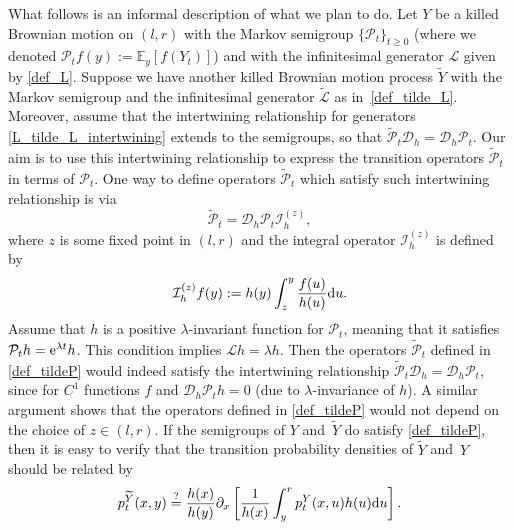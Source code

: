 \documentclass[pdftex]{sigma}
\numberwithin{equation}{section}
\theoremstyle{definition}
\def\L{{\mathcal L}}
\def\P{{\mathcal P}}
\def\D{{\mathcal D}}
\def\e{{\mathbb E}}
\def\d{{\textnormal d}}
\begin{document}
What follows is an informal description of what we plan to do. Let $Y$ be a killed Brownian motion on $(l,r)$ with the Markov semigroup $\{\P_t\}_{t\ge 0}$ (where we denoted $\P_t f(y):=\e_y [f(Y_t)]$) and
with the infinitesimal generator $\L$ given by \eqref{def_L}. Suppose we have another killed Brownian motion process
$\widetilde Y$ with the Markov semigroup \smash{$\big\{\widetilde \P_t\big\}_{t\ge 0}$}
and the infinitesimal generator $\widetilde \L$ as in~\eqref{def_tilde_L}. Moreover, assume that the intertwining relationship for generators \eqref{L_tilde_L_intertwining} extends to the semigroups, so that $\widetilde \P_t \D_h = \D_h \P_t$. Our aim is to use this intertwining relationship to express the transition operators $\widetilde \P_t$ in terms of $\P_t$. One way to define operators $\widetilde \P_t$ which satisfy such intertwining relationship is via
\begin{equation}\label{def_tildeP}
 \widetilde \P_t=\D_h \P_t {\mathcal I}^{(z)}_{h},
\end{equation}
where $z$ is some fixed point in $(l,r)$ and the integral operator ${\mathcal I}^{(z)}_{h}$ is defined by
\[
{\mathcal I}^{(z)}_{h} f(y):=h(y) \int_z^y \frac{f(u)}{h(u)} \d u.
\]
 Assume that $h$ is a positive $\lambda$-invariant function for $\P_t$, meaning that it satisfies $\P_t h={\rm e}^{\lambda t} h$. This condition implies $\L h=\lambda h$. Then the operators $\widetilde \P_t$ defined in \eqref{def_tildeP} would indeed satisfy the intertwining relationship $\widetilde \P_t \D_h = \D_h \P_t$, since \smash{${\mathcal I}^{(z)}_{h} \D_h f(y)=f(y)-f(z)h(y)/h(z)$} for $C^1$ functions $f$ and $\D_h \P_t h=0$ (due to $\lambda$-invariance of $h$). A similar argument shows that the operators defined in \eqref{def_tildeP} would not depend on the choice of $z \in (l,r)$. If the semigroups
of $Y$ and~$\widetilde Y$ do satisfy \eqref{def_tildeP}, then it is easy to verify that the transition probability densities of $\widetilde Y$ and~$Y$ should be related by
\begin{equation}\label{equation_tilde_p0}
 p_t^{\widetilde Y}(x,y) \stackrel{?}{=}\frac{h(x)}{h(y)} \partial_{x}
\left[ \frac{1}{h(x)} \int_{y}^r p_t^Y(x,u) h(u) \d u \right].
\end{equation}
\end{document}
